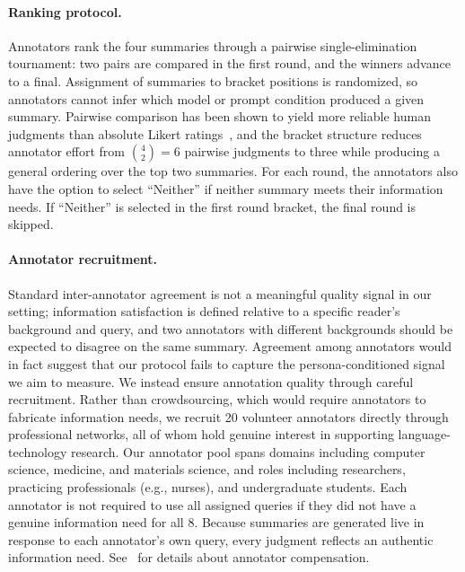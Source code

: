 \paragraph{Ranking protocol.}
Annotators rank the four summaries through a pairwise
single-elimination tournament: two pairs are compared in the first
round, and the winners advance to a final. Assignment of summaries to
bracket positions is randomized, so annotators cannot infer which
model or prompt condition produced a given summary. Pairwise
comparison has been shown to yield more reliable human judgments than
absolute Likert ratings~\cite{kiritchenko2017bws,liusie2024llmcomparative},
and the bracket structure reduces annotator effort from
$\binom{4}{2}=6$ pairwise judgments to three while producing a general
ordering over the top two summaries. For each round, the annotators also have the option to select ``Neither'' if neither summary meets their information needs. If ``Neither'' is selected in the first round bracket, the final round is skipped.

\paragraph{Annotator recruitment.}
Standard inter-annotator agreement is not a meaningful quality signal
in our setting; information satisfaction is defined relative to a
specific reader's background and query, and two annotators with
different backgrounds should be expected to disagree on the same
summary. Agreement among annotators would in fact suggest that our
protocol fails to capture the persona-conditioned signal we aim to
measure. We instead ensure annotation quality through careful
recruitment. Rather than crowdsourcing, which would require
annotators to fabricate information needs, we recruit 20 volunteer
annotators directly through professional networks, all of whom hold
genuine interest in supporting language-technology research. Our annotator pool spans domains including computer science, medicine, and materials
science, and roles including researchers, practicing professionals
(e.g., nurses), and undergraduate students. Each annotator is not required to use all assigned queries if they did not have a genuine information need for all 8. Because summaries are
generated live in response to each annotator's own query, every
judgment reflects an authentic information need. See~ for details about annotator compensation.


